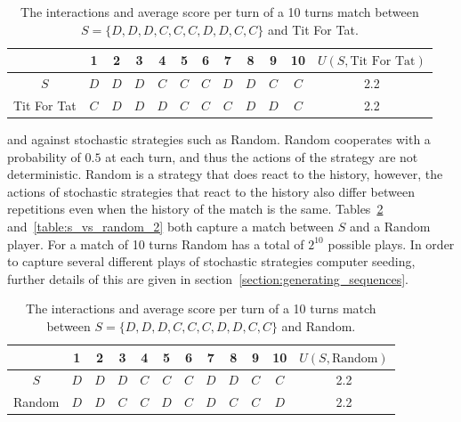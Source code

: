\begin{table}[htb]
\centering
\begin{tabular}{cccccccccccc}
    & \textbf{1} & \textbf{2} & \textbf{3} & \textbf{4}  & \textbf{5} & \textbf{6} & \textbf{7} & \textbf{8}  & \textbf{9} & \textbf{10} &
    \(U(S, \text{Tit For Tat})\) \\ \midrule
    \(S\) & \(D\) & \(D\) & \(D\) & \(C\) & \(C\) & \(C\) & \(D\) & \(D\) & \(C\) & \(C\) & 2.2 \\
    Tit For Tat & \(C\) & \(D\) & \(D\) & \(D\) & \(C\) & \(C\) & \(C\) & \(D\) & \(D\) & \(C\) & 2.2 \\ \bottomrule
\end{tabular}
\caption{The interactions and average score per turn of a 10 turns match between
\(S = \{D, D, D, C, C, C, D, D, C, C\}\) and Tit For Tat.}\label{table:s_vs_tft}
\end{table}

and against stochastic strategies such as Random. Random cooperates with a
probability of \(0.5\) at each turn, and thus the actions of the strategy are
not deterministic. Random is a strategy that does react to the history, however,
the actions of stochastic strategies that react to the
history also differ between repetitions even when the history of the match is
the same. Tables~\ref{table:s_vs_random} and~\ref{table:s_vs_random_2} both
capture a match between \(S\) and a Random player. For a match of 10 turns
Random has a total of \(2^{10}\) possible plays.
In order to capture several different plays of stochastic strategies computer
seeding, further details of this are given in section~\ref{section:generating_sequences}.

\begin{table}[htb]
\centering
\begin{tabular}{cccccccccccc}
    & \textbf{1} & \textbf{2} & \textbf{3} & \textbf{4}  & \textbf{5} & \textbf{6} & \textbf{7} & \textbf{8}  & \textbf{9} & \textbf{10} &
    \(U(S, \text{Random})\) \\ \midrule
    \(S\) & \(D\) & \(D\) & \(D\) & \(C\) & \(C\) & \(C\) & \(D\) & \(D\) & \(C\) & \(C\) & 2.2 \\
    Random & \(D\) & \(D\) & \(C\) & \(C\) & \(D\) & \(C\) & \(D\) & \(C\) & \(C\) & \(D\) & 2.2 \\ \bottomrule
\end{tabular}
\caption{The interactions and average score per turn of a 10 turns match between
\(S = \{D, D, D, C, C, C, D, D, C, C\}\) and Random.}\label{table:s_vs_random}
\end{table}

